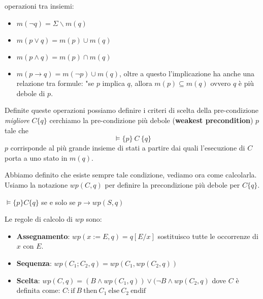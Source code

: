operazioni tra insiemi:
\begin{itemize}
    \item $m(\lnot q) = \Sigma \backslash m(q)$
    \item $m(p \lor q) = m(p) \cup m(q)$
    \item $m(p \land q) = m(p) \cap m(q)$
    \item $m(p \to q) = m(\lnot p) \cup m(q)$, oltre a questo l'implicazione ha
          anche una relazione tra formule: "se $p$ implica $q$, allora $m(p) \subseteq m(q)$
          ovvero $q$ è più debole di $p$.
\end{itemize}
Definite queste operazioni possiamo definire i criteri di scelta della pre-condizione
\textit{migliore} $C \{q\}$ cerchiamo la pre-condizione più debole
(\textbf{weakest precondition}) $p$ tale che $$\models \{p\} \ C \ \{q\}$$ $p$
corrisponde al più grande insieme di stati a partire dai quali l'esecuzione di
$C$ porta a uno stato in $m(q)$.

Abbiamo definito che esiste sempre tale condizione, vediamo ora come calcolarla.
Usiamo la notazione $wp(C, q)$ per definire la precondizione più debole per $C \{q\}$.
\begin{teorema}
    $\models \{p\} C \{q\}$ se e solo se $p \to wp(S, q)$
\end{teorema}
Le regole di calcolo di $wp$ sono:
\begin{itemize}
    \item \textbf{Assegnamento}: $wp(x := E, q) = q[E / x]$ sostituisco tutte le
          occorrenze di $x$ con $E$.
    \item \textbf{Sequenza}: $wp(C_1;C_2, q) = wp(C_1, wp(C_2, q))$
    \item \textbf{Scelta}: $wp(C, q) = (B \land wp(C_1, q)) \lor (\lnot B \land wp(C_2, q)$
          dove $C$ è definita come: $C: \text{if} \ B \ \text{then} \ C_1 \ \text{else} \ C_2 \ \text{endif}$
\end{itemize}
